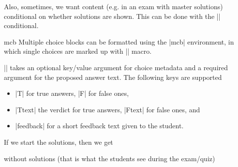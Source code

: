 \begin{function}{\ifsolutions}
  Also, sometimes, we want content (e.g. in an exam with master solutions) conditional on
  whether solutions are shown. This can be done with the |\ifsolutions| conditional.
\end{function}

\begin{environment}{mcb}
  Multiple choice blocks can be formatted using the |mcb| environment, in which single
  choices are marked up with |\mcc| macro.
\end{environment}

\begin{function}{\mcc}
  || takes an optional key/value argument
   for choice metadata and a required argument  for the proposed
  answer text. The following keys are supported
  \begin{itemize}
  \item |T| for true answers, |F| for false ones,
  \item |Ttext| the verdict for true answers, |Ftext| for false ones, and
  \item |feedback| for a short feedback text given to the student.
  \end{itemize}
\end{function}

If we start the solutions, then we get

without solutions (that is what the students see during the exam/quiz)

